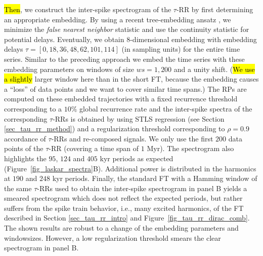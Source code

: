 \documentclass[entropy,article,accept,pdftex,moreauthors]{Definitions/mdpi}
\begin{document}
 \hl{Then}, we construct the inter-spike spectrogram of the $\tau$-RR by first determining an appropriate embedding. By using a recent tree-embedding ansatz \cite{Kraemer2022}, we minimize the 
\textit{false nearest neighbor} statistic \cite{hegger1999} and use the continuity statistic \cite{pecora2007} for potential delays. Eventually, we obtain $8$-dimensional embedding 
with embedding delays $\tau =[0, 18, 36, 48, 62, 101, 114]$ (in sampling units) for the entire time series. Similar to the preceding approach we embed the time series with these embedding parameters 
on windows of size $ws=1,200$ and a unity shift. ({\hl{We use a slightly} larger window here than in the short FT, because the embedding causes a ``loss'' of data points and we want to 
cover similar time spans.}) The RPs are computed on these embedded trajectories with a fixed recurrence threshold corresponding to a $10\%$ global recurrence rate \cite{kraemer2018} 
and the inter-spike spectra of the corresponding $\tau$-RRs is obtained by using STLS regression (see Section \ref{sec_tau_rr_method}) and a regularization threshold corresponding to 
$\rho=0.9$ accordance of $\tau$-RRs and re-composed signals. We only use the first $200$ data points of the $\tau$-RR (covering a time span of $1$ Myr). 
The spectrogram also highlights the $95$, $124$ and $405$ kyr periods as expected (Figure~\ref{fig_laskar_spectra}B). 
Additional power is distributed in the harmonics at $190$ and $248$ kyr periods. Finally, the standard FT with a Hamming window of the same $\tau$-RRs used to obtain the inter-spike 
spectrogram in panel B yields a smeared spectrogram which does not reflect the expected periods, but rather suffers from the spike train behavior, i.e., many excited harmonics, of the 
FT described in Section \ref{sec_tau_rr_intro} and Figure~\ref{fig_tau_rr_dirac_comb}. The shown results are robust to a change of the embedding parameters and windowsizes. However, a low 
regularization threshold smears the clear spectrogram in panel B.
\end{document}
